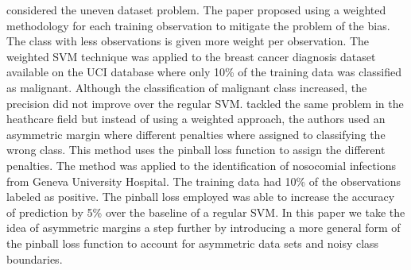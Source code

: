\documentclass[twoside,11pt]{article}
\begin{document}
\citet{Huang05} considered the uneven dataset problem. The paper proposed using a weighted methodology for each training observation to mitigate the problem of the bias. The class with less observations is given more weight per observation. The weighted SVM technique was applied to the breast cancer diagnosis dataset available on the UCI database where only 10\% of the training data was classified as malignant. Although the classification of malignant class increased,  the precision did not improve over the regular SVM. \citet{Cohen03} tackled the same problem in the heathcare field but instead of using a weighted approach, the authors used an asymmetric margin where different penalties where assigned to classifying the wrong class. This method uses the pinball loss function to assign the different penalties. The method was applied to the identification of nosocomial infections from Geneva University Hospital. The training data had 10\% of the observations labeled as positive. The pinball loss employed was able to increase the accuracy of prediction by 5\% over the baseline of a regular SVM. In this paper we take the idea of asymmetric margins a step further by introducing a more general form of the pinball loss function to account for asymmetric data sets and noisy class boundaries. 
\end{document}
